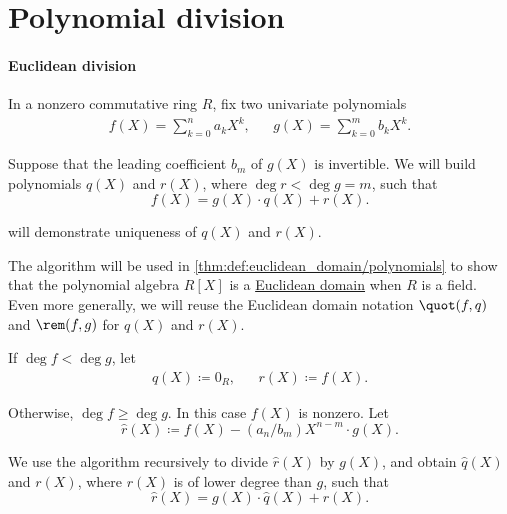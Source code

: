 \section{Polynomial division}\label{sec:polynomial_division}

\paragraph{Euclidean division}

\begin{algorithm}\label{alg:euclidean_division_of_polynomials}
  In a nonzero commutative ring \( R \), fix two univariate polynomials
  \begin{align*}
    f(X) = \sum_{k=0}^n a_k X^k, &&
    g(X) = \sum_{k=0}^m b_k X^k.
  \end{align*}

  Suppose that the leading coefficient \( b_m \) of \( g(X) \) is invertible. We will build polynomials \( q(X) \) and \( r(X) \), where \( \deg r < \deg g = m \), such that
  \begin{equation*}
    f(X) = g(X) \cdot q(X) + r(X).
  \end{equation*}

   will demonstrate uniqueness of \( q(X) \) and \( r(X) \).

  The algorithm will be used in \cref{thm:def:euclidean_domain/polynomials} to show that the polynomial algebra \( R[X] \) is a \hyperref[def:euclidean_domain]{Euclidean domain} when \( R \) is a field. Even more generally, we will reuse the Euclidean domain notation \( \quot(f, q) \) and \( \rem(f, g) \) for \( q(X) \) and \( r(X) \).

  \begin{thmenum}
     If \( \deg f < \deg g \), let
    \begin{align*}
      q(X) \coloneqq 0_R, &&
      r(X) \coloneqq f(X).
    \end{align*}

     Otherwise, \( \deg f \geq \deg g \). In this case \( f(X) \) is nonzero. Let
    \begin{equation*}
      \widehat r(X) \coloneqq f(X) - (a_n / b_m) X^{n-m} \cdot g(X).
    \end{equation*}

    We use the algorithm recursively to divide \( \widehat r(X) \) by \( g(X) \), and obtain \( \widehat q(X) \) and \( r(X) \), where \( r(X) \) is of lower degree than \( g \), such that
    \begin{equation*}
      \widehat r(X) = g(X) \cdot \widehat q(X) + r(X).
    \end{equation*}


\end{thmenum}
\end{algorithm}
